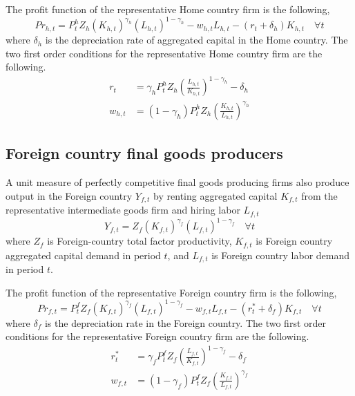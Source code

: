     The profit function of the representative Home country firm is the following,
    \begin{equation}\label{EqLgOpenProfit_H}
      Pr_{h,t} = P^h_t Z_h \left(K_{h,t}\right)^{\gamma_h}\left(L_{h,t}\right)^{1-\gamma_h} - w_{h,t}L_{h,t} - (r_t + \delta_h)K_{h,t} \quad\forall t
    \end{equation}
    where $\delta_h$ is the depreciation rate of aggregated capital in the Home country. The two first order conditions for the representative Home country firm are the following.
    \begin{align}
      r_t &= \gamma_h P^h_t Z_h\left(\frac{L_{h,t}}{K_{h,t}}\right)^{1-\gamma_h} - \delta_h \label{EqLgOpenFirmFOCK_H} \\
      w_{h,t} &= (1-\gamma_h)P^h_t Z_h\left(\frac{K_{h,t}}{L_{h,t}}\right)^{\gamma_h} \label{EqLgOpenFirmFOCL_H}
    \end{align}


  \subsection{Foreign country final goods producers}\label{SecLgOpenFirmFinal_F}

    A unit measure of perfectly competitive final goods producing firms also produce output in the Foreign country $Y_{f,t}$ by renting aggregated capital $K_{f,t}$ from the representative intermediate goods firm and hiring labor $L_{f,t}$
    \begin{equation}\label{EqLgOpenProdFunc_F}
      Y_{f,t} = Z_f \left(K_{f,t}\right)^{\gamma_f}\left(L_{f,t}\right)^{1-\gamma_f} \quad\forall t
    \end{equation}
    where $Z_f$ is Foreign-country total factor productivity, $K_{f,t}$ is Foreign country aggregated capital demand in period $t$, and $L_{f,t}$ is Foreign country labor demand in period $t$.

    The profit function of the representative Foreign country firm is the following,
    \begin{equation}\label{EqLgOpenProfit_F}
      Pr_{f,t} = P^f_t Z_f \left(K_{f,t}\right)^{\gamma_f}\left(L_{f,t}\right)^{1-\gamma_f} - w_{f,t}L_{f,t} - (r^*_t + \delta_f)K_{f,t} \quad\forall t
    \end{equation}
    where $\delta_f$ is the depreciation rate in the Foreign country. The two first order conditions for the representative Foreign country firm are the following.
    \begin{align}
      r^*_t &= \gamma_f P^f_t Z_f\left(\frac{L_{f,t}}{K_{f,t}}\right)^{1-\gamma_f} - \delta_f \label{EqLgOpenFirmFOCK_F} \\
      w_{f,t} &= (1-\gamma_f)P^f_t Z_f\left(\frac{K_{f,t}}{L_{f,t}}\right)^{\gamma_f} \label{EqLgOpenFirmFOCL_F}
    \end{align}


